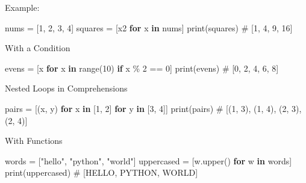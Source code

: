 \documentclass[
  letterpaper,
  DIV=11,
  numbers=noendperiod]{scrreprt}
\newenvironment{Shaded}{\begin{snugshade}}{\end{snugshade}}
\newcommand{\BuiltInTok}[1]{\textcolor[rgb]{0.00,0.23,0.31}{#1}}
\newcommand{\CommentTok}[1]{\textcolor[rgb]{0.37,0.37,0.37}{#1}}
\newcommand{\ControlFlowTok}[1]{\textcolor[rgb]{0.00,0.23,0.31}{\textbf{#1}}}
\newcommand{\DecValTok}[1]{\textcolor[rgb]{0.68,0.00,0.00}{#1}}
\newcommand{\KeywordTok}[1]{\textcolor[rgb]{0.00,0.23,0.31}{\textbf{#1}}}
\newcommand{\NormalTok}[1]{\textcolor[rgb]{0.00,0.23,0.31}{#1}}
\newcommand{\OperatorTok}[1]{\textcolor[rgb]{0.37,0.37,0.37}{#1}}
\newcommand{\StringTok}[1]{\textcolor[rgb]{0.13,0.47,0.30}{#1}}
\begin{document}
Example:

\begin{Shaded}
\begin{Highlighting}[]
\NormalTok{nums }\OperatorTok{=}\NormalTok{ [}\DecValTok{1}\NormalTok{, }\DecValTok{2}\NormalTok{, }\DecValTok{3}\NormalTok{, }\DecValTok{4}\NormalTok{]}
\NormalTok{squares }\OperatorTok{=}\NormalTok{ [x2 }\ControlFlowTok{for}\NormalTok{ x }\KeywordTok{in}\NormalTok{ nums]}
\BuiltInTok{print}\NormalTok{(squares)   }\CommentTok{\# [1, 4, 9, 16]}
\end{Highlighting}
\end{Shaded}

With a Condition

\begin{Shaded}
\begin{Highlighting}[]
\NormalTok{evens }\OperatorTok{=}\NormalTok{ [x }\ControlFlowTok{for}\NormalTok{ x }\KeywordTok{in} \BuiltInTok{range}\NormalTok{(}\DecValTok{10}\NormalTok{) }\ControlFlowTok{if}\NormalTok{ x }\OperatorTok{\%} \DecValTok{2} \OperatorTok{==} \DecValTok{0}\NormalTok{]}
\BuiltInTok{print}\NormalTok{(evens)   }\CommentTok{\# [0, 2, 4, 6, 8]}
\end{Highlighting}
\end{Shaded}

Nested Loops in Comprehensions

\begin{Shaded}
\begin{Highlighting}[]
\NormalTok{pairs }\OperatorTok{=}\NormalTok{ [(x, y) }\ControlFlowTok{for}\NormalTok{ x }\KeywordTok{in}\NormalTok{ [}\DecValTok{1}\NormalTok{, }\DecValTok{2}\NormalTok{] }\ControlFlowTok{for}\NormalTok{ y }\KeywordTok{in}\NormalTok{ [}\DecValTok{3}\NormalTok{, }\DecValTok{4}\NormalTok{]]}
\BuiltInTok{print}\NormalTok{(pairs)   }\CommentTok{\# [(1, 3), (1, 4), (2, 3), (2, 4)]}
\end{Highlighting}
\end{Shaded}

With Functions

\begin{Shaded}
\begin{Highlighting}[]
\NormalTok{words }\OperatorTok{=}\NormalTok{ [}\StringTok{"hello"}\NormalTok{, }\StringTok{"python"}\NormalTok{, }\StringTok{"world"}\NormalTok{]}
\NormalTok{uppercased }\OperatorTok{=}\NormalTok{ [w.upper() }\ControlFlowTok{for}\NormalTok{ w }\KeywordTok{in}\NormalTok{ words]}
\BuiltInTok{print}\NormalTok{(uppercased)   }\CommentTok{\# [\textquotesingle{}HELLO\textquotesingle{}, \textquotesingle{}PYTHON\textquotesingle{}, \textquotesingle{}WORLD\textquotesingle{}]}
\end{Highlighting}
\end{Shaded}
\end{document}
